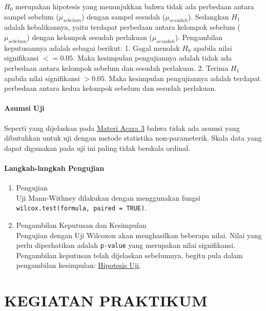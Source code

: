 \documentclass[
]{book}
\begin{document}
\(H_0\) merupakan hipotesis yang menunjukkan bahwa tidak ada perbedaan antara sampel sebelum (\(\mu_{sebelum}\)) dengan sampel sesudah (\(\mu_{sesudah}\)). Sedangkan \(H_1\) adalah kebalikannya, yaitu terdapat perbedaan antara kelompok sebelum (\(\mu_{sebelum}\)) dengan kelompok sesudah perlakuan (\(\mu_{sesudah}\)). Pengambilan keputusannya adalah sebagai berikut:
1. Gagal menolak \(H_0\) apabila nilai signifikansi \(<= 0.05\). Maka kesimpulan pengujiannya adalah tidak ada perbedaan antara kelompok sebelum dan sesudah perlakuan.
2. Terima \(H_1\) apabila nilai signifikansi \(> 0.05\). Maka kesimpulan pengujiannya adalah terdapat perbedaan antara kedua kelompok sebelum dan sesudah perlakuan.

\hypertarget{asumsi-uji-1}{%
\paragraph{Asumsi Uji}\label{asumsi-uji-1}}

Seperti yang dijelaskan pada \protect\hyperlink{a3-materi}{Materi Acara 3} bahwa tidak ada asumsi yang dibutuhkan untuk uji dengan metode statistika non-parameterik. Skala data yang dapat digunakan pada uji ini paling tidak berskala ordinal.

\hypertarget{langkah-langkah-pengujian-3}{%
\paragraph{Langkah-langkah Pengujian}\label{langkah-langkah-pengujian-3}}

\begin{enumerate}
\def\labelenumi{\arabic{enumi}.}
\item
  Pengujian\\
  Uji Mann-Withney dilakukan dengan menggunakan fungsi \texttt{wilcox.test(formula,\ paired\ =\ TRUE)}.
\item
  Pengambilan Keputusan dan Kesimpulan\\
  Pengujian dengan Uji Wilcoxon akan menghasilkan beberapa nilai. Nilai yang perlu diperhatikan adalah \texttt{p-value} yang merupakan nilai signifikansi. Pengambilan keputusan telah dijelaskan sebelumnya, begitu pula dalam pengambilan kesimpulan: \protect\hyperlink{a3-hipotesis-w-bebas}{Hipotesis Uji}.
\end{enumerate}

\hypertarget{kegiatan-praktikum-1}{%
\section{KEGIATAN PRAKTIKUM}\label{kegiatan-praktikum-1}}
\end{document}
